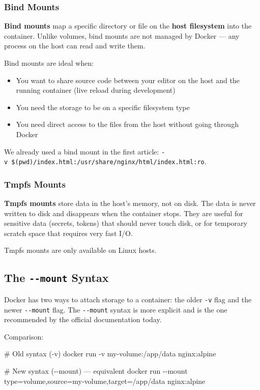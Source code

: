 \documentclass[11pt,american,a4paper,openany]{book}
\providecommand{\tightlist}{%
  \setlength{\itemsep}{2pt}\setlength{\parskip}{0pt}}
\newenvironment{Shaded}{}{}
\newcommand{\NormalTok}[1]{#1}
\begin{document}
\subsubsection{Bind Mounts}\label{bind-mounts}

\textbf{Bind mounts} map a specific directory or file on the
\textbf{host filesystem} into the container. Unlike volumes, bind mounts
are not managed by Docker --- any process on the host can read and write
them.

Bind mounts are ideal when:

\begin{itemize}
\tightlist
\item
  You want to share source code between your editor on the host and the
  running container (live reload during development)
\item
  You need the storage to be on a specific filesystem type
\item
  You need direct access to the files from the host without going
  through Docker
\end{itemize}

We already used a bind mount in the first article:
\texttt{-v\ \$(pwd)/index.html:/usr/share/nginx/html/index.html:ro}.

\subsubsection{Tmpfs Mounts}\label{tmpfs-mounts}

\textbf{Tmpfs mounts} store data in the host's memory, not on disk. The
data is never written to disk and disappears when the container stops.
They are useful for sensitive data (secrets, tokens) that should never
touch disk, or for temporary scratch space that requires very fast I/O.

Tmpfs mounts are only available on Linux hosts.

\subsection{\texorpdfstring{The \texttt{-\/-mount}
Syntax}{The -\/-mount Syntax}}\label{the---mount-syntax}

Docker has two ways to attach storage to a container: the older
\texttt{-v} flag and the newer \texttt{-\/-mount} flag. The
\texttt{-\/-mount} syntax is more explicit and is the one recommended by
the official documentation today.

Comparison:

\begin{Shaded}
\begin{Highlighting}[]
\NormalTok{\# Old syntax ({-}v)}
\NormalTok{docker run {-}v my{-}volume:/app/data nginx:alpine}

\NormalTok{\# New syntax ({-}{-}mount) — equivalent}
\NormalTok{docker run {-}{-}mount type=volume,source=my{-}volume,target=/app/data nginx:alpine}
\end{Highlighting}
\end{Shaded}
\end{document}
